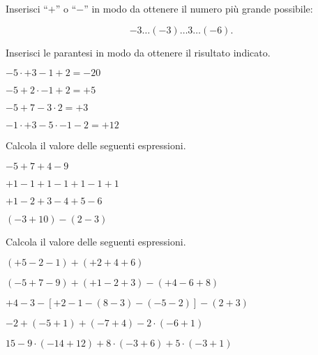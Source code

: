 \begin{esercizio}
Inserisci ``\(+\)'' o ``\(-\)'' in modo da ottenere il numero più grande 
possibile:

\vspace{-.5em}
 \[-3\ldots(-3)\ldots3\ldots(-6).\]
\end{esercizio}

\begin{esercizio}
Inserisci le parantesi in modo da ottenere il risultato indicato.

\vspace{-.5em}
 \begin{htmulticols}{2}
 \begin{enumeratees}
 \item \(-5 \cdot +3-1+2=-20\)
 \item \(-5+2\cdot-1+2=+5\)
 \item \(-5+7-3\cdot 2=+3\)
 \item \(-1\cdot +3-5\cdot -1-2=+12\)
 \end{enumeratees}
 \end{htmulticols}
\end{esercizio}

\begin{esercizio}
Calcola il valore delle seguenti espressioni.

\vspace{-.5em}
 \begin{htmulticols}{2}
 \begin{enumeratees}
 \item \(-5+7+4-9\)
 \item \(+1-1+1-1+1-1+1\)
 \item \(+1-2+3-4+5-6\)
 \item \((-3+10)-(2-3)\)
 \end{enumeratees}
 \end{htmulticols}
\end{esercizio}

\begin{esercizio} %
Calcola il valore delle seguenti espressioni.
 \begin{enumeratees}
 \item \((+5-2-1)+(+2+4+6)\)  
 \item \((-5+7-9)+(+1-2+3)-(+4-6+8)\)  
 \item \(+4-3-[+2-1-(8-3)-(-5-2)]-(2+3)\)  
 \item \(-2+(-5+1)+(-7+4)-2 \cdot (-6+1)\)  
 \item \(15-9 \cdot (-14+12)+8 \cdot (-3+6)+ 5 \cdot(-3+1)\)  
 \end{enumeratees}
\end{esercizio}


